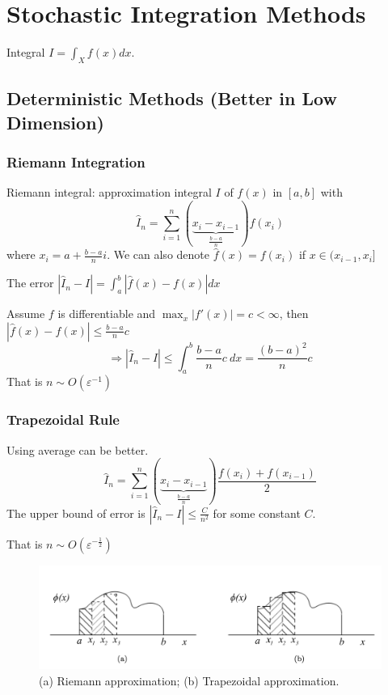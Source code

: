\documentclass[11pt,a4paper]{article}
\begin{document}
\section{Stochastic Integration Methods}
Integral $I=\int_Xf(x)dx$.

\subsection{Deterministic Methods (Better in Low Dimension)}
\subsubsection{Riemann Integration}
Riemann integral: approximation integral $I$ of $f(x)$ in $[a,b]$ with $$\hat{I}_n=\sum_{i=1}^n(\underbrace{x_i-x_{i-1}}_{\frac{b-a}{n}})f(x_i)$$
where $x_i=a+\frac{b-a}{n}i$. We can also denote $\hat{f}(x)=f(x_i)$ if $x\in (x_{i-1},x_i]$

The error $|\hat{I}_n-I|=\int_a^b|\hat{f}(x)-f(x)|dx$

Assume $f$ is differentiable and $\max_x|f'(x)|=c<\infty$, then $|\hat{f}(x)-f(x)|\leq \frac{b-a}{n}c$
$$\Rightarrow |\hat{I}_n-I|\leq \int_a^b\frac{b-a}{n}c\ dx=\frac{(b-a)^2}{n}c$$
That is $n\sim O\left(\varepsilon^{-1}\right)$

\subsubsection{Trapezoidal Rule}
Using average can be better. $$\hat{I}_n=\sum_{i=1}^n(\underbrace{x_i-x_{i-1}}_{\frac{b-a}{n}})\frac{f(x_i)+f(x_{i-1})}{2}$$
The upper bound of error is $|\hat{I}_n-I|\leq \frac{C}{n^2}$ for some constant $C$.

That is $n\sim O\left(\varepsilon^{-\frac{1}{2}}\right)$

\begin{center}\begin{figure}[htbp]
    \centering
    \includegraphics[scale=0.2]{Riemann and Trapezoidal.png}
    \caption{(a) Riemann approximation; (b) Trapezoidal approximation.}
    \label{}
\end{figure}\end{center}
\end{document}
